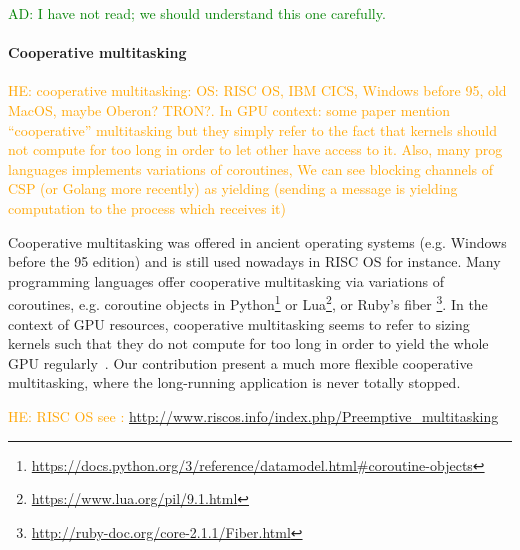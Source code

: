 \documentclass[numbers,nocopyrightspace,10pt]{sigplanconf}
\newcommand{\ADComment}[1]{\textcolor{green}{AD: #1}}
\newcommand{\HEComment}[1]{\textcolor{orange}{HE: #1}}
\begin{document}
\cite{DBLP:conf/ppopp/Muyan-OzcelikO16} \ADComment{I have not read; we
  should understand this one carefully.}

\paragraph{Cooperative multitasking}

\HEComment{cooperative multitasking: OS: RISC OS, IBM CICS, Windows
  before 95, old MacOS, maybe Oberon? TRON?. In GPU context: some
  paper mention ``cooperative'' multitasking but they simply refer to
  the fact that kernels should not compute for too long in order to
  let other have access to it. Also, many prog languages implements
  variations of coroutines, We can see blocking channels of CSP (or
  Golang more recently) as yielding (sending a message is yielding
  computation to the process which receives it)}

Cooperative multitasking was offered in ancient operating systems
(e.g. Windows before the 95 edition) and is still used nowadays in
RISC OS for instance. Many programming languages offer cooperative
multitasking via variations of coroutines, e.g. coroutine objects in
Python\footnote{\url{https://docs.python.org/3/reference/datamodel.html\#coroutine-objects}}
or Lua\footnote{\url{https://www.lua.org/pil/9.1.html}}, or Ruby's
fiber \footnote{\url{http://ruby-doc.org/core-2.1.1/Fiber.html}}. In
the context of GPU resources, cooperative multitasking seems to refer
to sizing kernels such that they do not compute for too long in order
to yield the whole GPU regularly~\cite{adriaens2012case}. Our
contribution present a much more flexible cooperative multitasking,
where the long-running application is never totally stopped.

\HEComment{ RISC OS see :
\url{http://www.riscos.info/index.php/Preemptive_multitasking}
}



\end{document}
